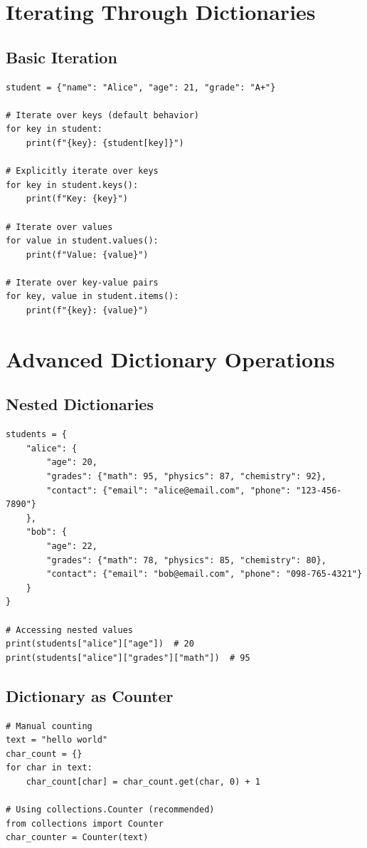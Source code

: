 \documentclass[12pt,a4paper]{article}
\begin{document}
\section{Iterating Through Dictionaries}

\subsection{Basic Iteration}

\begin{lstlisting}
student = {"name": "Alice", "age": 21, "grade": "A+"}

# Iterate over keys (default behavior)
for key in student:
    print(f"{key}: {student[key]}")

# Explicitly iterate over keys
for key in student.keys():
    print(f"Key: {key}")

# Iterate over values
for value in student.values():
    print(f"Value: {value}")

# Iterate over key-value pairs
for key, value in student.items():
    print(f"{key}: {value}")
\end{lstlisting}

\section{Advanced Dictionary Operations}

\subsection{Nested Dictionaries}

\begin{lstlisting}
students = {
    "alice": {
        "age": 20,
        "grades": {"math": 95, "physics": 87, "chemistry": 92},
        "contact": {"email": "alice@email.com", "phone": "123-456-7890"}
    },
    "bob": {
        "age": 22,
        "grades": {"math": 78, "physics": 85, "chemistry": 80},
        "contact": {"email": "bob@email.com", "phone": "098-765-4321"}
    }
}

# Accessing nested values
print(students["alice"]["age"])  # 20
print(students["alice"]["grades"]["math"])  # 95
\end{lstlisting}

\subsection{Dictionary as Counter}

\begin{lstlisting}
# Manual counting
text = "hello world"
char_count = {}
for char in text:
    char_count[char] = char_count.get(char, 0) + 1

# Using collections.Counter (recommended)
from collections import Counter
char_counter = Counter(text)
\end{lstlisting}
\end{document}
